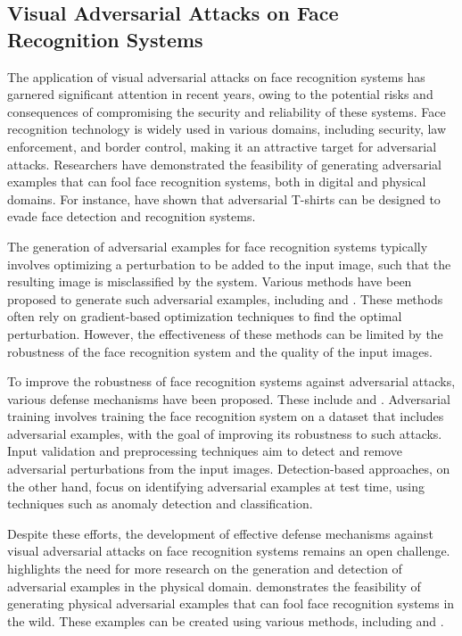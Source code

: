 \documentclass[11pt,a4paper]{article}
\begin{document}
\subsection{Visual Adversarial Attacks on Face Recognition Systems}


The application of visual adversarial attacks on face recognition systems has garnered significant attention in recent years, owing to the potential risks and consequences of compromising the security and reliability of these systems. Face recognition technology is widely used in various domains, including security, law enforcement, and border control, making it an attractive target for adversarial attacks. Researchers have demonstrated the feasibility of generating adversarial examples that can fool face recognition systems, both in digital and physical domains. For instance, \cite{arxiv:1910.11099} have shown that adversarial T-shirts can be designed to evade face detection and recognition systems.

The generation of adversarial examples for face recognition systems typically involves optimizing a perturbation to be added to the input image, such that the resulting image is misclassified by the system. Various methods have been proposed to generate such adversarial examples, including \cite{doi:10.1109/iccvw.2019.00257} and \cite{doi:10.32604/jai.2021.014175}. These methods often rely on gradient-based optimization techniques to find the optimal perturbation. However, the effectiveness of these methods can be limited by the robustness of the face recognition system and the quality of the input images.

To improve the robustness of face recognition systems against adversarial attacks, various defense mechanisms have been proposed. These include \cite{doi:10.1109/asp-dac47756.2020.9045584} and \cite{doi:10.1109/eurosp53844.2022.00047}. Adversarial training involves training the face recognition system on a dataset that includes adversarial examples, with the goal of improving its robustness to such attacks. Input validation and preprocessing techniques aim to detect and remove adversarial perturbations from the input images. Detection-based approaches, on the other hand, focus on identifying adversarial examples at test time, using techniques such as anomaly detection and classification.

Despite these efforts, the development of effective defense mechanisms against visual adversarial attacks on face recognition systems remains an open challenge. \cite{doi:10.1186/s42400-018-0012-9} highlights the need for more research on the generation and detection of adversarial examples in the physical domain. \cite{arxiv:1707.08945} demonstrates the feasibility of generating physical adversarial examples that can fool face recognition systems in the wild. These examples can be created using various methods, including \cite{doi:10.1016/j.patcog.2022.109009} and \cite{doi:10.1007/978-3-030-58589-1_3}.
\end{document}
